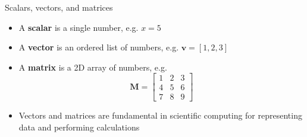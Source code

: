 \documentclass{beamer}
\begin{document}
\begin{frame}{Scalars, vectors, and matrices}
    \begin{itemize}
        \item A \textbf{scalar} is a single number, e.g. $x = 5$
        \item A \textbf{vector} is an ordered list of numbers, e.g. $\mathbf{v} = [1, 2, 3]$
        \item A \textbf{matrix} is a 2D array of numbers, e.g. 
        $$\mathbf{M} = \begin{bmatrix}
        1 & 2 & 3 \\
        4 & 5 & 6 \\
        7 & 8 & 9
        \end{bmatrix}$$
        \item Vectors and matrices are fundamental in scientific computing for representing data and performing calculations
    \end{itemize}
\end{frame}
\end{document}
